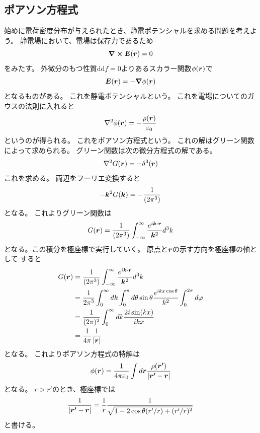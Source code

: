 \documentclass[../master.tex]{subfiles}
\begin{document}
\subsection{ポアソン方程式}
始めに電荷密度分布が与えられたとき、静電ポテンシャルを求める問題を考えよう。
静電場において、電場は保存力であるため
\begin{equation}
	\curl \vb*{E}(\vb*{r}) = 0
\end{equation}
をみたす。
外微分のもつ性質\(\text{dd}f=0\)よりあるスカラー関数\(\phi(\vb*{r})\)で
\begin{equation}
	\vb*{E}(\vb*{r})= -\grad \phi(\vb*{r})
\end{equation}
となるものがある。
これを静電ポテンシャルという。
これを電場についてのガウスの法則に入れると
\begin{equation}
	\laplacian \phi(\vb*{r}) = -\frac{\rho(\vb*{r})}{\varepsilon_0}
\end{equation}
というのが得られる。
これをポアソン方程式という。
これの解はグリーン関数によって求められる。
グリーン関数は次の微分方程式の解である。
\begin{equation}
	\laplacian G(\vb*{r}) = -\delta^3(\vb*{r})
\end{equation}
これを求める。
両辺をフーリエ変換すると
\begin{equation}
	-\vb*{k}^2G(\vb*{k}) = -\frac{1}{(2\pi^3)}
\end{equation}
となる。
これよりグリーン関数は
\begin{equation}
	G(\vb*{r})=\frac{1}{(2\pi^3)}\int_{-\infty}^{\infty} \frac{e^{i\vb*{k}\cdot\vb*{r}}}{\vb*{k}^2}d^3k
\end{equation}
となる。この積分を極座標で実行していく。
原点と\(\vb*{r}\)の示す方向を極座標の軸として
すると
\begin{equation}\begin{aligned}[b]
    G(\vb*{r}) & =\frac{1}{(2\pi^3)}\int_{-\infty}^{\infty} \frac{e^{i\vb*{k}\cdot\vb*{r}}}{\vb*{k}^2}d^3k                                  \\
	           & =\frac{1}{2\pi^3}\int_{0}^{\infty}dk \int_{0}^{\pi}d\theta \sin\theta \frac{e^{ikx\cos\theta}}{k^2}\int_{0}^{2\pi}d\varphi \\
	           & =\frac{1}{(2\pi)^2}\int_{0}^{\infty}dk \frac{2i\sin(kx)}{ikx}                                                              \\
	           & =\frac{1}{4\pi}\frac{1}{\abs{\vb*{r}}}
\end{aligned}\end{equation}
となる。
これよりポアソン方程式の特解は
\begin{equation}
	\phi(\vb*{r}) = \frac{1}{4\pi\varepsilon_0}\int d\vb*{r}
	\frac{\rho(\vb*{r'})}{\abs{\vb*{r'}-\vb*{r}}}
\end{equation}
となる。
\(r>r'\)のとき、極座標では
\begin{equation}
	\frac{1}{\abs{\vb*{r'}-\vb*{r}}} = \frac{1}{r}\frac{1}{\sqrt{1-2\cos\theta(r'/r) + (r'/r)^2}}
\end{equation}
と書ける。
\end{document}
